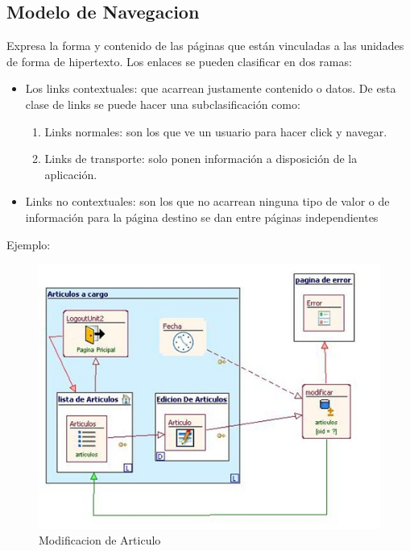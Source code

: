 \subsection{Modelo de Navegacion}

Expresa la forma y contenido de las p\'aginas que est\'an vinculadas a las 
unidades de forma de hipertexto. Los enlaces se pueden clasificar en dos ramas:

\begin{itemize}
    \item Los links contextuales: que acarrean justamente contenido o datos.
    De esta clase de links se puede hacer una subclasificaci\'on como: 
        \begin{enumerate}
            \item Links normales: son los que ve un usuario para hacer click y 
            navegar.   
            \item Links de transporte: solo ponen informaci\'on a disposici\'on 
            de la aplicaci\'on.    
        \end{enumerate}       
    \item Links no contextuales: son los que no acarrean ninguna tipo de valor
        o de informaci\'on para la p\'agina destino se dan entre p\'aginas 
        independientes
\end{itemize}        

Ejemplo: \\[0.5cm]

\begin{figure}[H]
    \centering
    \includegraphics[scale=1]{resourse/modificar-articulo.jpg}
    \caption{Modificacion de Articulo}
    \label{TFig:03}
\end{figure} 


